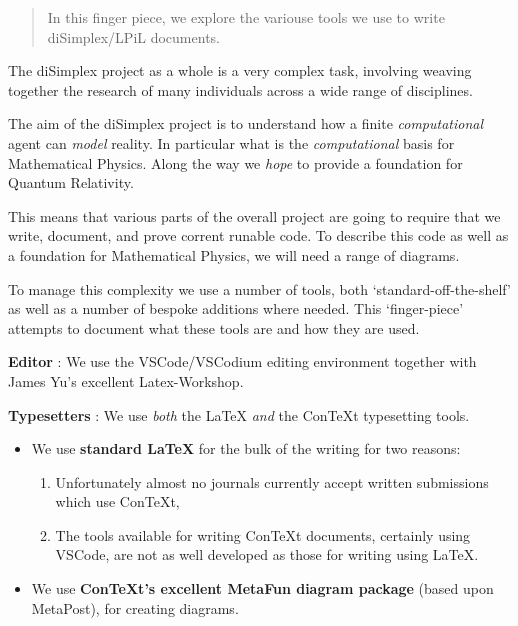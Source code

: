 
\author{Stephen Gaito}

\begin{abstract}
  In this finger piece, we explore the variouse tools we use to write
  diSimplex/LPiL documents.
\end{abstract}

\maketitle

The diSimplex project as a whole is a very complex task, involving weaving
together the research of many individuals across a wide range of disciplines.

The aim of the diSimplex project is to understand how a finite
\emph{computational} agent can \emph{model} reality. In particular what is the
\emph{computational} basis for Mathematical Physics. Along the way we
\emph{hope} to provide a foundation for Quantum Relativity.

This means that various parts of the overall project are going to require that
we write, document, and prove corrent runable code. To describe this code as
well as a foundation for Mathematical Physics, we will need a range of diagrams.

To manage this complexity we use a number of tools, both
`standard-off-the-shelf' as well as a number of bespoke additions where needed.
This `finger-piece' attempts to document what these tools are and how they are
used.

\textbf{Editor} : We use the VSCode/VSCodium editing environment
together with James Yu's excellent Latex-Workshop.

\textbf{Typesetters} : We use \emph{both} the LaTeX \emph{and} the
ConTeXt typesetting tools.
\begin{itemize}
  \item We use \textbf{standard LaTeX} for the bulk of the writing for two
  reasons:
  \begin{enumerate}
    \item Unfortunately almost no journals currently accept written
    submissions which use ConTeXt,
    \item The tools available for writing ConTeXt documents, certainly using
    VSCode, are not as well developed as those for writing using LaTeX.
  \end{enumerate}
  \item We use \textbf{ConTeXt's excellent MetaFun diagram package} (based
  upon MetaPost), for creating diagrams.
\end{itemize}

